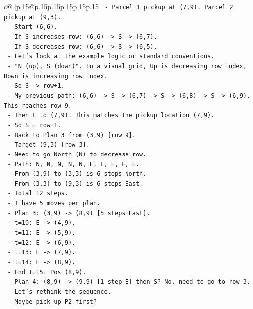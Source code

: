 \documentclass{article}
\begin{document}
{\begin{supertabular}{c@{$\;$}|p{.15\linewidth}@{}p{.15\linewidth}p{.15\linewidth}p{.15\linewidth}p{.15\linewidth}p{.15\linewidth}}
{{{\texttt{  {-} Parcel 1 pickup at (7,9). Parcel 2 pickup at (9,3).} \\
\texttt{  {-} Start (6,6).} \\
\texttt{  {-} If S increases row: (6,6) {-}> S {-}> (6,7).} \\
\texttt{  {-} If S decreases row: (6,6) {-}> S {-}> (6,5).} \\
\texttt{  {-} Let's look at the example logic or standard conventions.} \\
\texttt{  {-} "N (up), S (down)". In a visual grid, Up is decreasing row index, Down is increasing row index.} \\
\texttt{  {-} So S {-}> row+1.} \\
\texttt{  {-} My previous path: (6,6) {-}> S {-}> (6,7) {-}> S {-}> (6,8) {-}> S {-}> (6,9). This reaches row 9.} \\
\texttt{  {-} Then E to (7,9). This matches the pickup location (7,9).} \\
\texttt{  {-} So S = row+1.} \\
\texttt{  {-} Back to Plan 3 from (3,9) {[}row 9{]}.} \\
\texttt{  {-} Target (9,3) {[}row 3{]}.} \\
\texttt{  {-} Need to go North (N) to decrease row.} \\
\texttt{  {-} Path: N, N, N, N, N, E, E, E, E, E.} \\
\texttt{  {-} From (3,9) to (3,3) is 6 steps North.} \\
\texttt{  {-} From (3,3) to (9,3) is 6 steps East.} \\
\texttt{  {-} Total 12 steps.} \\
\texttt{  {-} I have 5 moves per plan.} \\
\texttt{  {-} Plan 3: (3,9) {-}> (8,9) {[}5 steps East{]}.} \\
\texttt{    {-} t=10: E {-}> (4,9).} \\
\texttt{    {-} t=11: E {-}> (5,9).} \\
\texttt{    {-} t=12: E {-}> (6,9).} \\
\texttt{    {-} t=13: E {-}> (7,9).} \\
\texttt{    {-} t=14: E {-}> (8,9).} \\
\texttt{    {-} End t=15. Pos (8,9).} \\
\texttt{  {-} Plan 4: (8,9) {-}> (9,9) {[}1 step E{]} then S? No, need to go to row 3.} \\
\texttt{  {-} Let's rethink the sequence.} \\
\texttt{  {-} Maybe pick up P2 first?} \\
}}}
\end{supertabular}}
\end{document}
